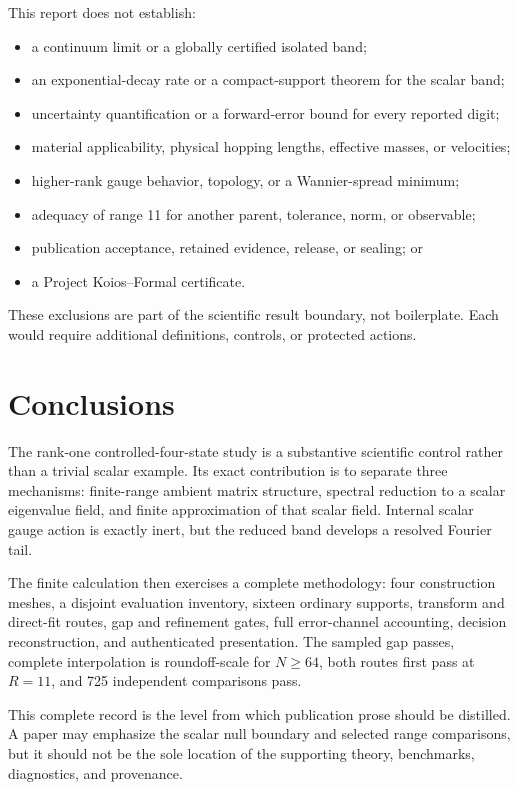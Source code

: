 \documentclass[11pt]{article}
\begin{document}
This report does not establish:
\begin{itemize}
\item a continuum limit or a globally certified isolated band;
\item an exponential-decay rate or a compact-support theorem for the scalar band;
\item uncertainty quantification or a forward-error bound for every reported digit;
\item material applicability, physical hopping lengths, effective masses, or velocities;
\item higher-rank gauge behavior, topology, or a Wannier-spread minimum;
\item adequacy of range 11 for another parent, tolerance, norm, or observable;
\item publication acceptance, retained evidence, release, or sealing; or
\item a Project Koios--Formal certificate.
\end{itemize}
These exclusions are part of the scientific result boundary, not boilerplate.  Each
would require additional definitions, controls, or protected actions.

\section{Conclusions}

The rank-one controlled-four-state study is a substantive scientific control rather than
a trivial scalar example.  Its exact contribution is to separate three mechanisms:
finite-range ambient matrix structure, spectral reduction to a scalar eigenvalue field,
and finite approximation of that scalar field.  Internal scalar gauge action is exactly
inert, but the reduced band develops a resolved Fourier tail.

The finite calculation then exercises a complete methodology: four construction meshes,
a disjoint evaluation inventory, sixteen ordinary supports, transform and direct-fit
routes, gap and refinement gates, full error-channel accounting, decision reconstruction,
and authenticated presentation.  The sampled gap passes, complete interpolation is
roundoff-scale for $N\ge64$, both routes first pass at $R=11$, and 725 independent
comparisons pass.

This complete record is the level from which publication prose should be distilled.  A
paper may emphasize the scalar null boundary and selected range comparisons, but it
should not be the sole location of the supporting theory, benchmarks, diagnostics, and
provenance.
\end{document}
